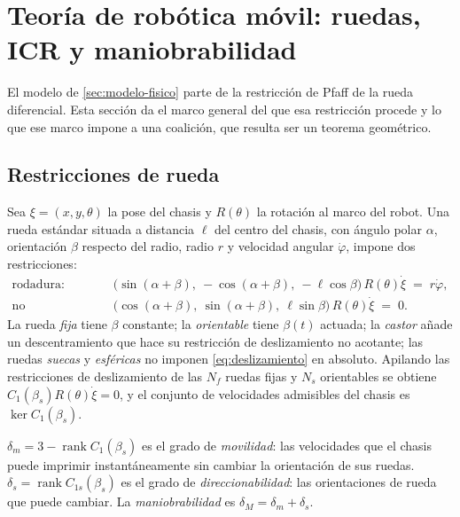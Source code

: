 \section{Teoría de robótica móvil: ruedas, ICR y maniobrabilidad}
\label{sec:robotica}

El modelo de \cref{sec:modelo-fisico} parte de la restricción de Pfaff de la rueda diferencial. Esta sección da el marco general del que esa restricción procede \cite{siegwart2011introduction} y lo que ese marco impone a
una coalición, que resulta ser un teorema geométrico.

\subsection{Restricciones de rueda}

Sea $\xi=(x,y,\theta)$ la pose del chasis y $R(\theta)$ la rotación al marco del
robot. Una rueda estándar situada a distancia $\ell$ del centro del chasis, con
ángulo polar $\alpha$, orientación $\beta$ respecto del radio, radio $r$ y
velocidad angular $\dot\varphi$, impone dos restricciones:
\begin{align}
  \text{rodadura:}&\quad
  \bigl(\sin(\alpha+\beta),\ -\cos(\alpha+\beta),\ -\ell\cos\beta\bigr)\,R(\theta)\dot\xi
  \;=\;r\dot\varphi, \label{eq:rodadura}\\
  \text{no deslizamiento:}&\quad
  \bigl(\cos(\alpha+\beta),\ \sin(\alpha+\beta),\ \ell\sin\beta\bigr)\,R(\theta)\dot\xi
  \;=\;0. \label{eq:deslizamiento}
\end{align}
La rueda \emph{fija} tiene $\beta$ constante; la \emph{orientable} tiene
$\beta(t)$ actuada; la \emph{castor} añade un descentramiento que hace su
restricción de deslizamiento no acotante; las ruedas \emph{suecas} y
\emph{esféricas} no imponen \eqref{eq:deslizamiento} en absoluto. Apilando las
restricciones de deslizamiento de las $N_f$ ruedas fijas y $N_s$ orientables se
obtiene $C_1(\beta_s)R(\theta)\dot\xi=0$, y el conjunto de velocidades
admisibles del chasis es $\ker C_1(\beta_s)$.

\begin{definicion}
\label{def:maniobrabilidad}
$\delta_m=3-\operatorname{rank}C_1(\beta_s)$ es el grado de \emph{movilidad}:
las velocidades que el chasis puede imprimir instantáneamente sin cambiar la
orientación de sus ruedas. $\delta_s=\operatorname{rank}C_{1s}(\beta_s)$ es el
grado de \emph{direccionabilidad}: las orientaciones de rueda que puede cambiar.
La \emph{maniobrabilidad} es $\delta_M=\delta_m+\delta_s$.
\end{definicion}

